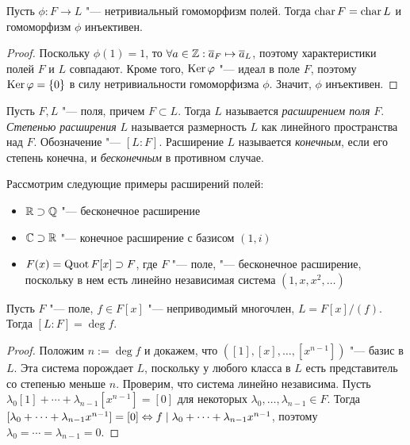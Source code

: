 \begin{proposition}
	Пусть $\phi: F \to L$ "--- нетривиальный гомоморфизм полей. Тогда $\operatorname{char}{F} = \operatorname{char}{L}$ и гомоморфизм $\phi$ инъективен.
\end{proposition}

\begin{proof}
	Поскольку $\phi(1) = 1$, то $\forall a \in \mathbb{Z}: \overline{a}_F \mapsto \overline{a}_L$, поэтому характеристики полей $F$ и $L$ совпадают. Кроме того, $\operatorname{Ker}\varphi$ "--- идеал в поле $F$, поэтому $\operatorname{Ker}\varphi = \{0\}$ в силу нетривиальности гомоморфизма $\phi$. Значит, $\phi$ инъективен.
\end{proof}

\begin{definition}
	Пусть $F, L$ "--- поля, причем $F \subset L$. Тогда $L$ называется \textit{расширением поля} $F$. \textit{Степенью расширения} $L$ называется размерность $L$ как линейного пространства над $F$. Обозначение "--- $[L : F]$.  Расширение $L$ называется \textit{конечным}, если его степень конечна, и \textit{бесконечным} в противном случае.
\end{definition}

\begin{example}
	Рассмотрим следующие примеры расширений полей:
	\begin{itemize}
		\item $\mathbb{R} \supset \mathbb{Q}$ "--- бесконечное расширение
		\item $\mathbb{C} \supset \mathbb{R}$ "--- конечное расширение с базисом $(1, i)$
		\item $F(x) = \operatorname{Quot} F[x] \supset F$, где $F$ "--- поле, "--- бесконечное расширение, поскольку в нем есть линейно независимая система $(1, x, x^2, \dotsc)$
	\end{itemize}
\end{example}

\begin{proposition}
	Пусть $F$ "--- поле, $f \in F[x]$ "--- неприводимый многочлен, $L = F[x] / (f)$. Тогда $[L : F] = \deg{f}$.
\end{proposition}

\begin{proof}
	Положим $n := \deg{f}$ и докажем, что $([1], [x], \dotsc, [x^{n - 1}])$ "--- базис в $L$. Эта система порождает $L$, поскольку у любого класса в $L$ есть представитель со степенью меньше $n$. Проверим, что система линейно независима. Пусть $\lambda_0[1] + \dotsb + \lambda_{n - 1}[x^{n - 1}] = [0]$ для некоторых $\lambda_0, \dotsc, \lambda_{n - 1} \in F$. Тогда $[\lambda_0 + \dotsb + \lambda_{n - 1}x^{n - 1}] = [0] \Leftrightarrow f \mid \lambda_0 + \dotsb + \lambda_{n - 1}x^{n - 1}$, поэтому $\lambda_0 = \dotsb = \lambda_{n - 1} = 0$.
\end{proof}

